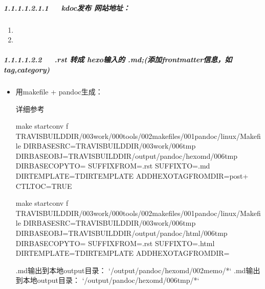 \documentclass[letterpaper,12pt,english]{sphinxmanual}
\begin{document}
\subparagraph{1.1.1.1.2.1.1   kdoc发布 网站地址：}
\label{\detokenize{001software/001install/001._u7f51_u7ad9/gitpage:kdoc}}\begin{enumerate}
%
\item {} 

\item {} 

\end{enumerate}


\subparagraph{1.1.1.1.2.2   .rst 转成 hexo输入的 .md;(添加frontmatter信息，如tag,category)}
\label{\detokenize{001software/001install/001._u7f51_u7ad9/gitpage:rst-hexo-md-frontmatter-tag-category}}\begin{itemize}
\item {} 
用makefile + pandoc生成：

详细参考 

\begin{sphinxVerbatim}[commandchars=\\\{\}]
make startconv \PYGZhy{}f \PYGZdl{}TRAVIS\PYGZus{}BUILD\PYGZus{}DIR/003work/000tools/002makefiles/001pandoc/linux/Makefile DIR\PYGZus{}BASE\PYGZus{}SRC=\PYGZdl{}TRAVIS\PYGZus{}BUILD\PYGZus{}DIR/003work/006tmp DIR\PYGZus{}BASE\PYGZus{}OBJ=\PYGZdl{}TRAVIS\PYGZus{}BUILD\PYGZus{}DIR/output/pandoc/hexomd/006tmp DIR\PYGZus{}BASE\PYGZus{}COPYTO= SUFFIX\PYGZus{}FROM=.rst SUFFIX\PYGZus{}TO=.md DIR\PYGZus{}TEMPLATE=\PYGZdl{}T\PYGZus{}DIR\PYGZus{}TEMPLATE ADD\PYGZus{}HEXO\PYGZus{}TAG\PYGZus{}FROM\PYGZus{}DIR=post+ CTL\PYGZus{}TOC=TRUE

make startconv \PYGZhy{}f \PYGZdl{}TRAVIS\PYGZus{}BUILD\PYGZus{}DIR/003work/000tools/002makefiles/001pandoc/linux/Makefile DIR\PYGZus{}BASE\PYGZus{}SRC=\PYGZdl{}TRAVIS\PYGZus{}BUILD\PYGZus{}DIR/003work/006tmp DIR\PYGZus{}BASE\PYGZus{}OBJ=\PYGZdl{}TRAVIS\PYGZus{}BUILD\PYGZus{}DIR/output/pandoc/html/006tmp DIR\PYGZus{}BASE\PYGZus{}COPYTO= SUFFIX\PYGZus{}FROM=.rst SUFFIX\PYGZus{}TO=.html DIR\PYGZus{}TEMPLATE=\PYGZdl{}T\PYGZus{}DIR\PYGZus{}TEMPLATE ADD\PYGZus{}HEXO\PYGZus{}TAG\PYGZus{}FROM\PYGZus{}DIR=
\end{sphinxVerbatim}

\begin{sphinxVerbatim}[commandchars=\\\{\}]
.md输出到本地output目录： `/output/pandoc/hexomd/002memo/*`
.md输出到本地output目录： `/output/pandoc/hexomd/006tmp/*`
\end{sphinxVerbatim}


\end{itemize}
\end{document}
